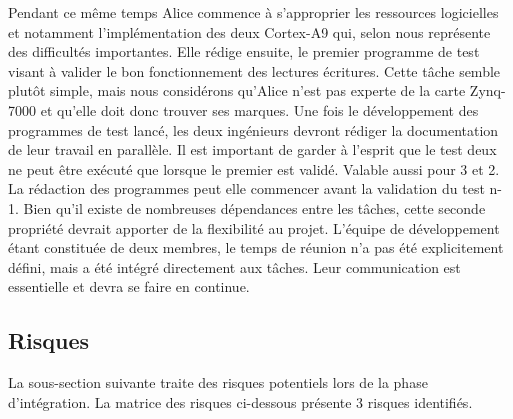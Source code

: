 Pendant ce même temps Alice commence à s'approprier les ressources logicielles et notamment l'implémentation des deux Cortex-A9 qui, selon nous représente des difficultés importantes.
Elle rédige ensuite, le premier programme de test visant à valider le bon fonctionnement des lectures écritures.
Cette tâche semble plutôt simple, mais nous considérons qu'Alice n'est pas experte de la carte Zynq-7000 et qu'elle doit donc trouver ses marques.
Une fois le développement des programmes de test lancé, les deux ingénieurs devront rédiger la documentation de leur travail en parallèle.
Il est important de garder à l'esprit que le test deux ne peut être exécuté que lorsque le premier est validé. 
Valable aussi pour 3 et 2.
La rédaction des programmes peut elle commencer avant la validation du test n-1.
Bien qu'il existe de nombreuses dépendances entre les tâches, cette seconde propriété devrait apporter de la flexibilité au projet.
L'équipe de développement étant constituée de deux membres, le temps de réunion n'a pas été explicitement défini, mais a été intégré directement aux tâches.
Leur communication est essentielle et devra se faire en continue.








\subsection{Risques}



La sous-section suivante traite des risques potentiels lors de la phase d'intégration.
La matrice des risques ci-dessous présente 3 risques identifiés.

